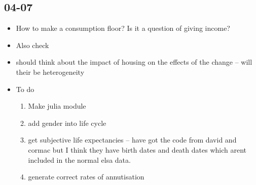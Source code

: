\documentclass[12pt]{article}
\begin{document}
\subsection{\textbf{04-07}}
\begin{itemize}
      \item How to make a consumption floor? Is it a question of giving income?
      \item Also check
      \item should think about the impact of housing on the effects of the change
            -- will their be heterogeneity

      \item To do
            \begin{enumerate}
                  \item Make julia module
                  \item add gender into life cycle
                  \item get subjective life expectancies -- have got the code from
                        david and cormac but I think they have birth dates and death dates which
                        arent included in the normal elsa data.
                  \item generate correct rates of annutisation
            \end{enumerate}
\end{itemize}
\end{document}
